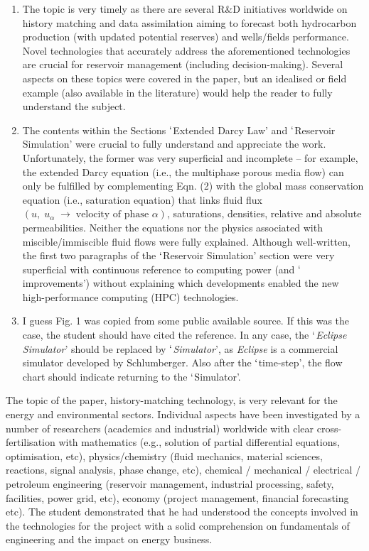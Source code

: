 \documentclass[14pt,twoside]{report}
\begin{document}
\begin{enumerate}
%
\item The topic is very timely as there are several R$\&$D initiatives worldwide on history matching and data assimilation aiming to forecast both hydrocarbon production (with updated potential reserves) and wells/fields performance. Novel technologies that accurately address the aforementioned technologies are crucial for reservoir management (including decision-making). Several aspects on these topics were covered in the paper, but an idealised or field example (also available in the literature) would help the reader to fully understand the subject.
%
\item The contents within the Sections $\lq$Extended Darcy Law' and $\lq$Reservoir Simulation' were crucial to fully understand and appreciate the work. Unfortunately, the former was very superficial and incomplete -- for example, the extended Darcy equation (i.e., the multiphase porous media flow) can only be fulfilled by complementing Eqn. (2) with the global mass conservation equation (i.e., saturation equation) that links fluid flux $\left(u,\;u_{\alpha}\;\rightarrow\;\text{velocity of phase }\alpha\right)$, saturations, densities, relative and absolute permeabilities. Neither the equations nor the physics associated with miscible/immiscible fluid flows were fully explained. Although well-written, the first two paragraphs of the $\lq$Reservoir Simulation' section were very superficial with continuous reference to computing power (and $\lq$improvements') without explaining which developments enabled the new high-performance computing (HPC) technologies.
%
\item I guess Fig. 1 was copied from some public available source. If this was the case, the student should have cited the reference. In any case, the $\lq${\it Eclipse Simulator}' should be replaced by $\lq${\it Simulator}', as {\it Eclipse} is a commercial simulator developed by Schlumberger. Also after the $\lq$time-step', the flow chart should indicate returning to the $\lq$Simulator'.
\end{enumerate}

The topic of the paper, history-matching technology, is very relevant for the energy and environmental sectors. Individual aspects have been investigated by a number of researchers (academics and industrial) worldwide with clear cross-fertilisation with mathematics (e.g., solution of partial differential equations, optimisation, etc), physics/chemistry (fluid mechanics, material sciences, reactions, signal analysis, phase change, etc), chemical / mechanical / electrical / petroleum engineering (reservoir management, industrial processing, safety, facilities, power grid, etc), economy (project management, financial forecasting etc). The student demonstrated that he had understood the concepts involved in the technologies for the project with a solid comprehension on fundamentals of engineering and the impact on energy business.    
\end{document}
